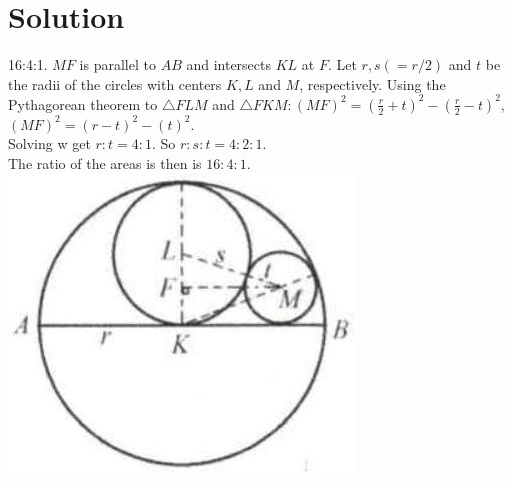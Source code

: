 \documentclass{article}
\begin{document}
\section*{Solution}
16:4:1.
\(M F\) is parallel to \(A B\) and intersects \(K L\) at \(F\). Let \(r, s(=r / 2)\) and \(t\) be the radii of the circles with centers \(K, L\) and \(M\), respectively. Using the Pythagorean theorem to \(\triangle F L M\) and \(\triangle F K M:(M F)^{2}=\left(\frac{r}{2}+t\right)^{2}-\left(\frac{r}{2}-t\right)^{2}\), \((M F)^{2}=(r-t)^{2}-(t)^{2}\).\\
Solving w get \(r: t=4: 1\). So \(r: s: t=4: 2: 1\).\\
The ratio of the areas is then is \(16: 4: 1\).\\
\centering
\includegraphics[width=\textwidth]{images/reasoning_image_1.jpg}
\end{document}
